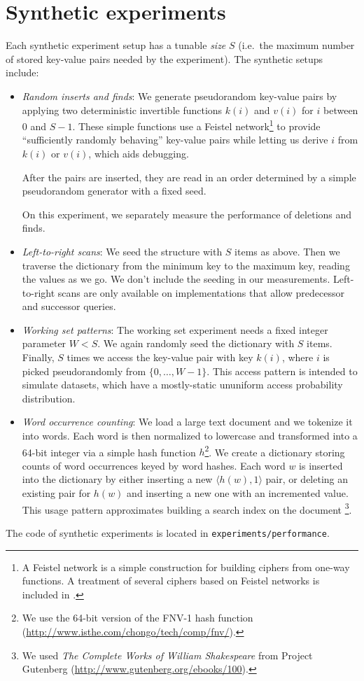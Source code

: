 \section{Synthetic experiments}
Each synthetic experiment setup has a tunable \emph{size} $S$
(i.e.\ the maximum number of stored key-value pairs needed by the experiment).
The synthetic setups include:
\begin{itemize}
\item
	\emph{Random inserts and finds}: We generate pseudorandom key-value
	pairs by applying two deterministic invertible functions $k(i)$
	and $v(i)$ for $i$ between 0 and $S-1$.
	These simple functions use a Feistel network\footnote{%
		A Feistel network is a simple construction for building
		ciphers from one-way functions. A treatment of several ciphers
		based on Feistel networks is included in
		\cite{applied-cryptography}.
	} to provide
	``sufficiently randomly behaving'' key-value pairs while letting us
	derive $i$ from $k(i)$ or $v(i)$, which aids debugging.

	After the pairs are inserted, they are read in an order determined
	by a simple pseudorandom generator with a fixed seed.

	On this experiment, we separately measure the performance of deletions
	and finds.

\item
	\emph{Left-to-right scans}: We seed the structure with $S$ items
	as above. Then we traverse the dictionary from the minimum key to
	the maximum key, reading the values as we go. We don't include
	the seeding in our measurements.
	Left-to-right scans are only available on implementations that
	allow predecessor and successor queries.

\item
	\emph{Working set patterns}: The working set experiment needs
	a fixed integer parameter $W<S$. We again randomly seed the dictionary
	with $S$ items. Finally, $S$ times we access the key-value pair
	with key $k(i)$, where $i$ is picked pseudorandomly from
	$\{0,\ldots,W-1\}$.
	This access pattern is intended to simulate datasets, which have
	a mostly-static ununiform access probability distribution.

\item
	\emph{Word occurrence counting}: We load a large text document
	and we tokenize it into words. Each word is then normalized
	to lowercase and transformed into a 64-bit integer via a simple
	hash function $h$\footnote{%
		We use the 64-bit version of the FNV-1 hash function
		(\url{http://www.isthe.com/chongo/tech/comp/fnv/}).
	}. We create a dictionary storing counts of word
	occurrences keyed by word hashes. Each word $w$ is inserted into
	the dictionary by either inserting a new $\langle h(w), 1\rangle$ pair,
	or deleting an existing pair for $h(w)$ and inserting a new one
	with an incremented value.
	This usage pattern approximates building a search index on the document
	\footnote{%
		We used \emph{The Complete Works of William Shakespeare}
		from Project Gutenberg
		(\url{http://www.gutenberg.org/ebooks/100}).
	}.
\end{itemize}
The code of synthetic experiments is located in \texttt{experiments/performance}.

